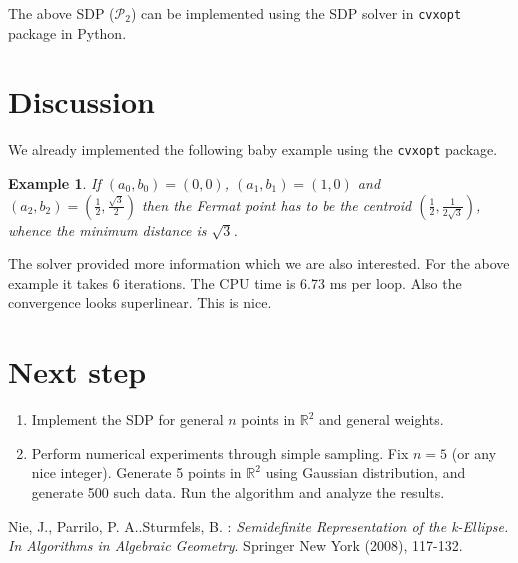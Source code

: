 \documentclass[11pt,letter]{article}
\newtheorem{eg}[thm]{Example}
\numberwithin{equation}{section}
\newcommand{\dis}{\displaystyle}
\newcommand{\R}{\mathbb{R}}
\begin{document}
The above SDP ($\mathcal{P}_2$) can be implemented using the SDP solver in \verb+cvxopt+ package in Python. 

\section{Discussion}

We already implemented the following baby example using the \verb+cvxopt+ package.

\begin{eg}
If $(a_0, b_0) =  (0,0)$, $(a_1,b_1) = (1,0)$ and $\dis (a_2,b_2) = \left( \frac{1}{2}, \frac{\sqrt{3}}{2} \right)$ then 
the Fermat point has to be the centroid $\dis \left(\frac{1}{2}, \frac{1}{2\sqrt{3}}\right)$, whence the minimum distance is $\sqrt{3}$. 

\end{eg}

The solver provided more information which we are also interested. For the above example it takes 6 iterations. The CPU time is 6.73 ms per loop. Also the convergence looks superlinear. This is nice.

\section{Next step}

\begin{enumerate}
\item
Implement the SDP for general $n$ points in $\R^2$ and general weights. 
\item
Perform numerical experiments through simple sampling. Fix $n  = 5$ (or any nice integer). Generate 5 points in $\R^2$ using Gaussian distribution, and generate 500 such data. Run the algorithm and analyze the results. 
\end{enumerate}



\begin{thebibliography}{9999}



{\sc Nie, J., Parrilo, P. A..Sturmfels, B. }: 
{\it Semidefinite Representation of the k-Ellipse. In Algorithms in Algebraic Geometry}.
Springer New York (2008),  117-132. 















\end{thebibliography}
\end{document}

